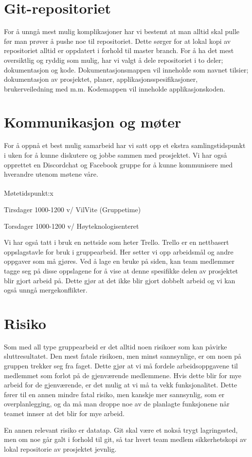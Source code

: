 \documentclass{article}
\begin{document}
\section*{Git-repositoriet}
For å unngå mest mulig komplikasjoner har vi bestemt at man alltid skal pulle før man prøver å pushe noe til repositoriet. Dette sørger for at lokal kopi av repositoriet alltid er oppdatert i forhold til master branch. For å ha det mest oversiktlig og ryddig som mulig, har vi valgt å dele repositoriet i to deler; dokumentasjon og kode. Dokumentasjonsmappen vil inneholde som navnet tilsier; dokumentasjon av prosjektet, planer, applikasjonsspesifikasjoner, brukerveiledning med m.m. Kodemappen vil inneholde applikasjonskoden.

\section*{Kommunikasjon og møter}
For å oppnå et best mulig samarbeid har vi satt opp et ekstra samlingstidspunkt i uken for å kunne diskutere og jobbe sammen med prosjektet. Vi har også opprettet en Discordchat og Facebook gruppe for å kunne kommunisere med hverandre utenom møtene våre.\\\\
Møtetidspunkt:x
			\begin{list}{-}{}
				\item Tirsdager 1000-1200 v/ VilVite (Gruppetime) 
				\item Torsdager 1000-1200 v/ Høyteknologisenteret
			\end{list}

Vi har også tatt i bruk en nettside som heter Trello. Trello er en nettbasert oppslagstavle for bruk i gruppearbeid. Her setter vi opp arbeidsmål og andre oppgaver som må gjøres. Ved å lage en bruke på siden, kan team medlemmer tagge seg på disse oppslagene for å vise at denne spesifikke delen av prosjektet blir gjort arbeid på. Dette gjør at det ikke blir gjort dobbelt arbeid og vi kan også unngå mergekonflikter.

\section*{Risiko}
Som med all type gruppearbeid er det alltid noen risikoer som kan påvirke sluttresultatet. Den mest fatale risikoen, men minst sannsynlige, er om noen på gruppen trekker seg fra faget. Dette gjør at vi må fordele arbeidsoppgavene til medlemmet som forlot på de gjenværende medlemmene. Hvis dette blir for mye arbeid for de gjenværende, er det mulig at vi må ta vekk funksjonalitet. Dette fører til en annen mindre fatal risiko, men kanskje mer sannsynlig, som er overplanlegging, og da må man droppe noe av de planlagte funksjonene når teamet innser at det blir for mye arbeid.

En annen relevant risiko er datatap. Git skal være et nokså trygt lagringssted, men om noe går galt i forhold til git, så tar hvert team medlem sikkerhetskopi av lokal repositorie av prosjektet jevnlig.
\end{document}
